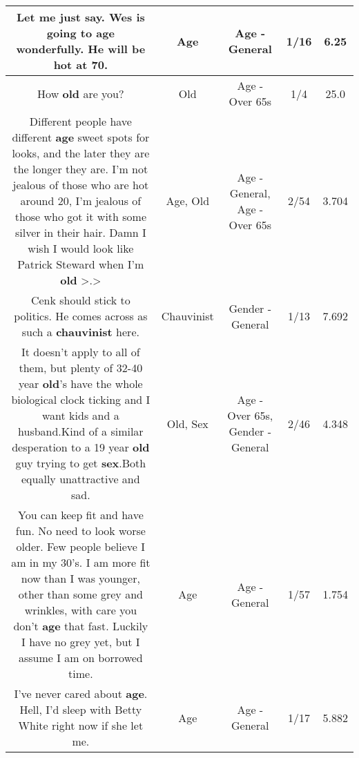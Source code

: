 \documentclass[11pt]{article}
\newlength\mylength
\begin{document}
\begin{center}
\begin{longtable}{|C{.65\mylength}|C{.30\mylength}|C{.12\mylength}|C{.12\mylength}|C{.12\mylength}|}
  \small Let me just say. Wes is going to \textbf{age} wonderfully. He will be hot at 70.\normalsize   & Age & Age - General & 1/16 & 6.25 \\  \hline
  \small How \textbf{old} are you?\normalsize   & Old & Age - Over 65s & 1/4 & 25.0 \\  \hline
  \small Different people have different \textbf{age} sweet spots for looks, and the later they are the longer they are. I'm not jealous of those who are hot around 20, I'm jealous of those who got it with some silver in their hair. Damn I wish I would look like Patrick Steward when I'm \textbf{old} >.>\normalsize   & Age, Old & Age - General, Age - Over 65s & 2/54 & 3.704 \\  \hline
  \small Cenk should stick to politics. He comes across as such a \textbf{chauvinist} here.\normalsize   & Chauvinist & Gender - General & 1/13 & 7.692 \\  \hline
  \small It doesn't apply to all of them, but plenty of 32-40 year \textbf{old}'s have the whole biological clock ticking and I want kids and a husband.Kind of a similar desperation to a 19 year \textbf{old} guy trying to get \textbf{sex}.Both equally unattractive and sad.\normalsize   & Old, Sex & Age - Over 65s, Gender - General & 2/46 & 4.348 \\  \hline
  \small You can keep fit and have fun. No need to look worse older. Few people believe I am in my 30's. I am more fit now than I was younger, other than some grey and wrinkles, with care you don't \textbf{age} that fast. Luckily I have no grey yet, but I assume I am on borrowed time.\normalsize   & Age & Age - General & 1/57 & 1.754 \\  \hline
  \small I've never cared about \textbf{age}. Hell, I'd sleep with Betty White right now if she let me.\normalsize   & Age & Age - General & 1/17 & 5.882 \\  \hline

\end{longtable}
\end{center}
\end{document}
